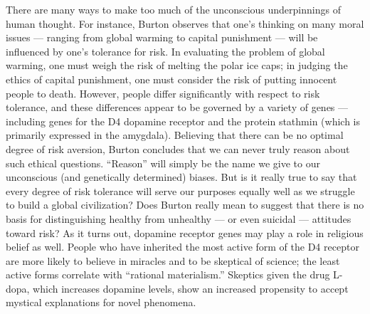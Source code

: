 \documentclass[a4paper,14pt]{extbook}
\begin{document}
There are many ways to make too much of the unconscious underpinnings of human thought.
For instance, Burton observes that one’s thinking on many moral issues --- ranging from global warming to capital punishment --- will be influenced by one’s tolerance for risk.
In evaluating the problem of global warming, one must weigh the risk of melting the polar ice caps;
in judging the ethics of capital punishment, one must consider the risk of putting innocent people to death.
However, people differ significantly with respect to risk tolerance, and these differences appear to be governed by a variety of genes --- including genes for the D4 dopamine receptor and the protein stathmin (which is primarily expressed in the amygdala).
Believing that there can be no optimal degree of risk aversion, Burton concludes that we can never truly reason about such ethical questions.
``Reason'' will simply be the name we give to our unconscious (and genetically determined) biases.
But is it really true to say that every degree of risk tolerance will serve our purposes equally well as we struggle to build a global civilization?
Does Burton really mean to suggest that there is no basis for distinguishing healthy from unhealthy --- or even suicidal --- attitudes toward risk?
As it turns out, dopamine receptor genes may play a role in religious belief as well.
People who have inherited the most active form of the D4 receptor are more likely to believe in miracles and to be skeptical of science;
the least active forms correlate with ``rational materialism.''
Skeptics given the drug L-dopa, which increases dopamine levels, show an increased propensity to accept mystical explanations for novel phenomena.
\end{document}
